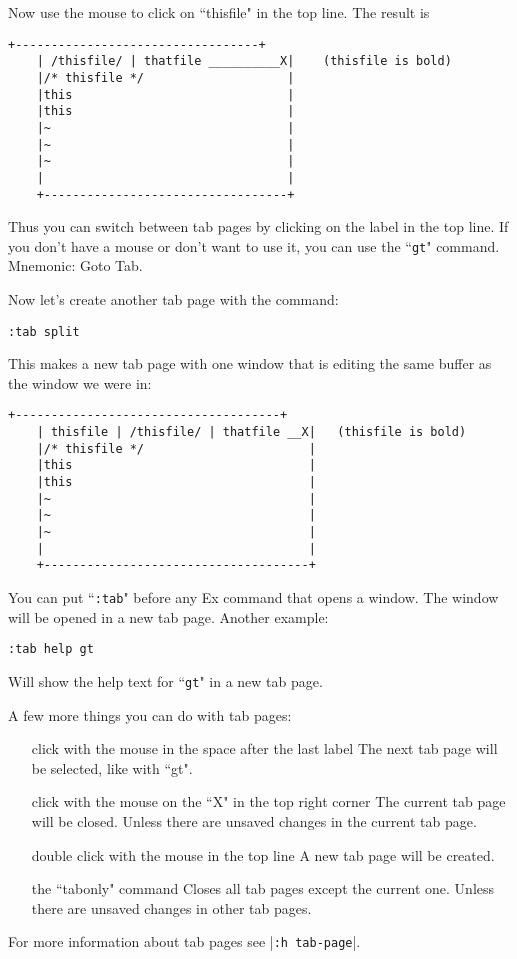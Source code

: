 Now use the mouse to click on ``thisfile" in the top line.
The result is

		\begin{Verbatim}[samepage=true]
    +----------------------------------+
    | /thisfile/ | thatfile __________X|    (thisfile is bold)
    |/* thisfile */                    |
    |this                              |
    |this                              |
    |~                                 |
    |~                                 |
    |~                                 |
    |                                  |
    +----------------------------------+
						\end{Verbatim}

Thus you can switch between tab pages by clicking on the label in the top line.
If you don't have a mouse or don't want to use it, you can use the ``\texttt{gt}" command.
Mnemonic: Goto Tab.

Now let's create another tab page with the command:

 \begin{Verbatim}[samepage=true]
 :tab split
 \end{Verbatim}

This makes a new tab page with one window that is editing the same buffer as the window we were in:

\begin{Verbatim}[samepage=true]
    +-------------------------------------+
    | thisfile | /thisfile/ | thatfile __X|   (thisfile is bold)
    |/* thisfile */                       |
    |this                                 |
    |this                                 |
    |~                                    |
    |~                                    |
    |~                                    |
    |                                     |
    +-------------------------------------+
\end{Verbatim}

You can put ``\texttt{:tab}" before any Ex command that opens a window.
The window will be opened in a new tab page.
Another example:

 \begin{Verbatim}[samepage=true]
 :tab help gt
 \end{Verbatim}

Will show the help text for ``\texttt{gt}" in a new tab page.

A few more things you can do with tab pages:
\begin{itemize}
	\item [click with the mouse in the space after the last label] The next tab page will be selected, like with ``gt".
	\item [click with the mouse on the ``X" in the top right corner] The current tab page will be closed.
								Unless there are unsaved changes in the current tab page.
							\item [double click with the mouse in the top line] A new tab page will be created.
							\item [the ``tabonly" command] Closes all tab pages except the current one.
								Unless there are unsaved changes in other tab pages.
\end{itemize}
For more information about tab pages see |\texttt{:h tab-page}|.
\clearpage
